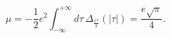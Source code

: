 \begin{equation}
\mu=-\frac{1}{2}e^2\int_{-\infty}^{+\infty} d\tau\, \Delta_{\frac{e^2}{\pi}}
(|\tau|)=\frac{e\sqrt{\pi}}{4}.
\end{equation}

